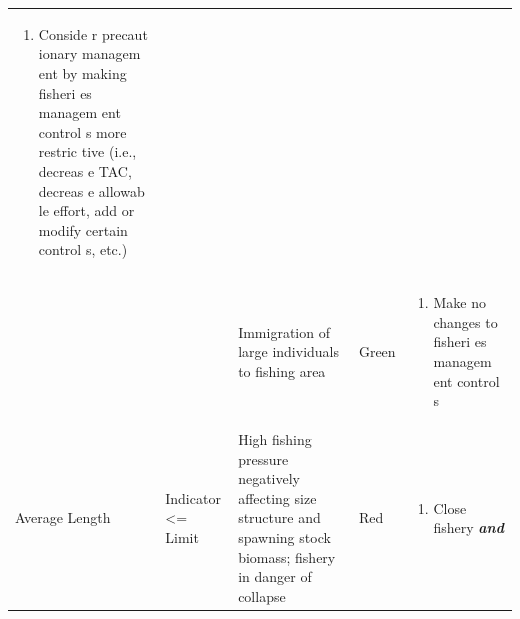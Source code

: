 \documentclass[]{book}
\providecommand{\tightlist}{%
  \setlength{\itemsep}{0pt}\setlength{\parskip}{0pt}}
\begin{document}
\begin{longtable}[]{@{}lllll@{}}
\begin{minipage}[t]{0.19\columnwidth}
\begin{enumerate}
\tightlist
\item
  Conside r precaut ionary managem ent by making fisheri es managem ent
  control s more restric tive (i.e., decreas e TAC, decreas e allowab le
  effort, add or modify certain control s, etc.)
\end{enumerate}\strut
\end{minipage}\tabularnewline
\begin{minipage}[t]{0.19\columnwidth}\raggedright\strut
\strut
\end{minipage} & \begin{minipage}[t]{0.19\columnwidth}\raggedright\strut
\strut
\end{minipage} & \begin{minipage}[t]{0.19\columnwidth}\raggedright\strut
Immigration of large individuals to fishing area\strut
\end{minipage} & \begin{minipage}[t]{0.19\columnwidth}\raggedright\strut
Green\strut
\end{minipage} & \begin{minipage}[t]{0.19\columnwidth}\raggedright\strut
\begin{enumerate}
\def\labelenumi{\arabic{enumi}.}
\tightlist
\item
  Make no changes to fisheri es managem ent control s
\end{enumerate}\strut
\end{minipage}\tabularnewline
\begin{minipage}[t]{0.19\columnwidth}\raggedright\strut
Average Length\strut
\end{minipage} & \begin{minipage}[t]{0.19\columnwidth}\raggedright\strut
Indicator \textless{}= Limit\strut
\end{minipage} & \begin{minipage}[t]{0.19\columnwidth}\raggedright\strut
High fishing pressure negatively affecting size structure and spawning
stock biomass; fishery in danger of collapse\strut
\end{minipage} & \begin{minipage}[t]{0.19\columnwidth}\raggedright\strut
Red\strut
\end{minipage} & \begin{minipage}[t]{0.19\columnwidth}\raggedright\strut
\begin{enumerate}
\def\labelenumi{\arabic{enumi}.}
\tightlist
\item
  Close fishery \textbf{\emph{and} }
\end{enumerate}


\end{minipage}
\end{longtable}
\end{document}

